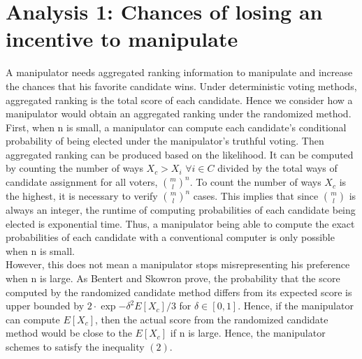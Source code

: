 \documentclass[letterpaper]{article} %
\begin{document}
\section{Analysis 1: Chances of losing an incentive to manipulate}
A manipulator needs aggregated ranking information to manipulate and increase the chances that his favorite candidate wins. Under deterministic voting methods, aggregated ranking is the total score of each candidate. Hence we consider how a manipulator would obtain an aggregated ranking under the randomized method. First, when n is small, a manipulator can compute each candidate's conditional probability of being elected under the manipulator's truthful voting. Then aggregated ranking can be produced based on the likelihood. It can be computed by counting the number of ways $X_c > X_i$
$\forall i \in C$ divided by the total ways of candidate assignment for all voters, $\binom{m}{l}^n$. To count the number of ways $X_c$ is the highest, it is necessary to verify $\binom{m}{l}^n $ cases. This implies that since $\binom{m}{l}$ is always an integer, the runtime of computing probabilities of each candidate being elected is exponential time. Thus, a manipulator being able to compute the exact probabilities of each candidate with a conventional computer is only possible when n is small.\\
However, this does not mean a manipulator stops misrepresenting his preference when n is large. As Bentert and Skowron prove, the probability that the score computed by the randomized candidate method differs from its expected score is upper bounded by $2\cdot\exp{-\delta^2E[X_c]/3}$ for $\delta \in [0,1]$. Hence, if the manipulator can compute $E[X_c]$, then the actual score from the randomized candidate method would be close to the $E[X_c]$ if n is large. Hence, the manipulator schemes to satisfy the inequality $(2)$.
\end{document}
